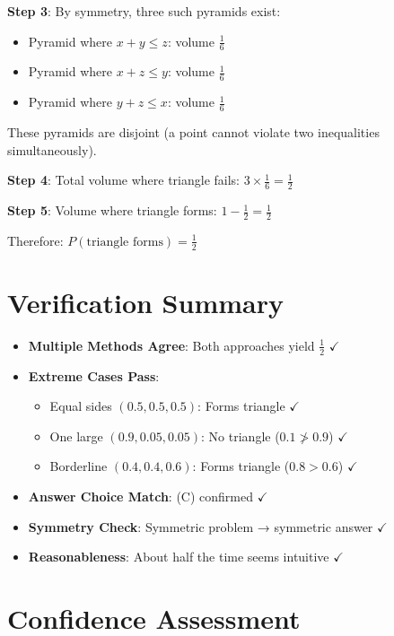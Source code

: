 \documentclass[11pt]{article}
\begin{document}
\textbf{Step 3}: By symmetry, three such pyramids exist:
\begin{itemize}
    \item Pyramid where $x+y \leq z$: volume $\frac{1}{6}$
    \item Pyramid where $x+z \leq y$: volume $\frac{1}{6}$
    \item Pyramid where $y+z \leq x$: volume $\frac{1}{6}$
\end{itemize}

These pyramids are disjoint (a point cannot violate two inequalities simultaneously).

\textbf{Step 4}: Total volume where triangle fails: $3 \times \frac{1}{6} = \frac{1}{2}$

\textbf{Step 5}: Volume where triangle forms: $1 - \frac{1}{2} = \frac{1}{2}$

Therefore: $P(\text{triangle forms}) = \boxed{\frac{1}{2}}$

\section*{Verification Summary}

\begin{itemize}[leftmargin=*]
    \item \textbf{Multiple Methods Agree}: Both approaches yield $\frac{1}{2}$ $\checkmark$
    \item \textbf{Extreme Cases Pass}:
    \begin{itemize}
        \item Equal sides $(0.5,0.5,0.5)$: Forms triangle $\checkmark$
        \item One large $(0.9,0.05,0.05)$: No triangle ($0.1 \not> 0.9$) $\checkmark$
        \item Borderline $(0.4,0.4,0.6)$: Forms triangle ($0.8>0.6$) $\checkmark$
    \end{itemize}
    \item \textbf{Answer Choice Match}: (C) confirmed $\checkmark$
    \item \textbf{Symmetry Check}: Symmetric problem → symmetric answer $\checkmark$
    \item \textbf{Reasonableness}: About half the time seems intuitive $\checkmark$
\end{itemize}

\section*{Confidence Assessment}
\end{document}
